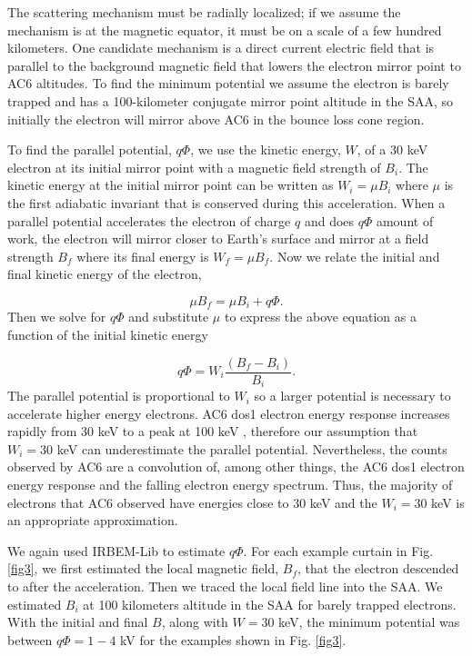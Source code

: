 \documentclass[draft]{agujournal2019}
\begin{document}
The scattering mechanism must be radially localized; if we assume the mechanism is at the magnetic equator, it must be on a scale of a few hundred kilometers. One candidate mechanism is a direct current electric field that is parallel to the background magnetic field that lowers the electron mirror point to AC6 altitudes. To find the minimum potential we assume the electron is barely trapped and has a 100-kilometer conjugate mirror point altitude in the SAA, so initially the electron will mirror above AC6 in the bounce loss cone region. 

To find the parallel potential, $q \Phi$,  we use the kinetic energy, $W$, of a $30$ keV electron at its initial mirror point with a magnetic field strength of $B_i$. The kinetic energy at the initial mirror point can be written as $W_i = \mu B_i$ where $\mu$ is the first adiabatic invariant that is conserved during this acceleration. When a parallel potential accelerates the electron of charge $q$ and does $q \Phi$ amount of work, the electron will mirror closer to Earth's surface and mirror at a field strength $B_f$ where its final energy is $W_f = \mu B_f$. Now we relate the initial and final kinetic energy of the electron,

\begin{equation}
\mu B_f = \mu B_i + q \Phi.
\end{equation} Then we solve for $q \Phi$ and substitute $\mu$ to express the above equation as a function of the initial kinetic energy 

\begin{equation}
 q \Phi = W_i \frac{(B_f - B_i)}{B_i}.
\end{equation} The parallel potential is proportional to $W_i$ so a larger potential is necessary to accelerate higher energy electrons. AC6 dos1 electron energy response increases rapidly from 30 keV to a peak at 100 keV \cite<Figure 2 in>{O'brien2019}, therefore our assumption that $W_i = 30$ keV can underestimate the parallel potential. Nevertheless, the counts observed by AC6 are a convolution of, among other things, the AC6 dos1 electron energy response and the falling electron energy spectrum. Thus, the majority of electrons that AC6 observed have energies close to 30 keV and the $W_i = 30$ keV is an appropriate approximation.

We again used IRBEM-Lib to estimate $ q \Phi$. For each example curtain in Fig. \ref{fig3}, we first estimated the local magnetic field, $B_f$, that the electron descended to after the acceleration. Then we traced the local field line into the SAA. We estimated $B_i$ at 100 kilometers altitude in the SAA for barely trapped electrons. With the initial and final $B$, along with $W = 30$ keV, the minimum potential was between $q \Phi = 1-4$ kV for the examples shown in Fig. \ref{fig3}. 
\end{document}

